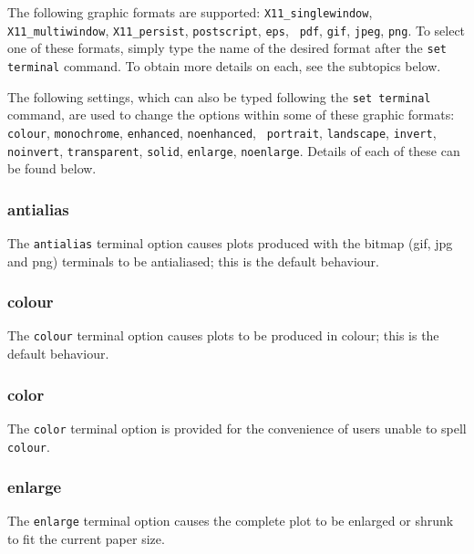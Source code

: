 The following graphic formats are supported:  {\tt X11\_singlewindow},
\newline\noindent %
{\tt X11\_multiwindow}, {\tt X11\_persist}, {\tt postscript}, {\tt eps}, {\tt
pdf}, {\tt gif}, {\tt jpeg}, {\tt png}. To select one of these formats, simply
type the name of the desired format after the {\tt set terminal} command. To
obtain more details on each, see the subtopics below.

The following settings, which can also be typed following the {\tt set terminal}
command, are used to change the options within some of these graphic formats:
{\tt colour}, {\tt monochrome}, {\tt enhanced}, {\tt noenhanced}, {\tt
portrait}, {\tt landscape}, {\tt invert}, {\tt noinvert}, {\tt transparent},
{\tt solid}, {\tt enlarge}, {\tt noenlarge}. Details of each of these can be
found below.

\subsubsection{antialias}

The {\tt antialias} terminal option causes plots produced with the bitmap (gif,
jpg and png) terminals to be antialiased; this is the default behaviour.

\subsubsection{colour}

The {\tt colour} terminal option causes plots to be produced in colour; this is
the default behaviour.

\subsubsection{color}

The {\tt color} terminal option is provided for the convenience of users unable
to spell {\tt colour}.

\subsubsection{enlarge}

The {\tt enlarge} terminal option causes the complete plot to be enlarged or
shrunk to fit the current paper size.

